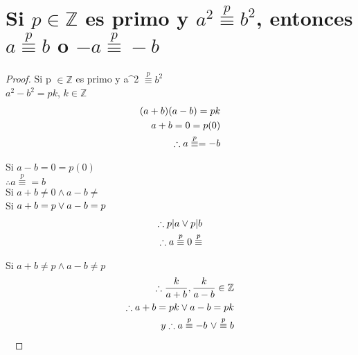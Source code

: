 \section{Si $p \in \mathbb{Z}$ es primo y $a^2 \stackrel{p}{\equiv} b^2$, entonces $a \stackrel{p}{\equiv} b$ o $-a \stackrel{p}{\equiv} -b$}
 \begin{proof}

    Si p $\in \mathbb{Z}$  es primo y a^2 $\stackrel{p}{ \equiv } b^2$ \\
   $a^2-b^2 = pk$,  $k \in \mathbb{Z}$
   \begin{align}
        \notag (a+b)(a-b)= pk\\
        \notag a+b = 0=p(0)\\
        \notag \therefore a \stackrel{p}{ \equiv } = -b\\
   \end{align}

   Si $a-b = 0=p(0)$\\
   $\therefore a \stackrel{p}{ \equiv } = b$\\
    Si $a+b \neq 0 \land a-b \neq $\\
    Si  $a+b= p  \lor a-b = p\\$
    \begin{align}
    \notag \therefore p | a \lor p | b \\
    \notag \therefore a\stackrel{p}{ \equiv } 0 \stackrel{p}{ \equiv } \\
    \end{align}

    Si $ a+b \neq p  \land a-b \neq p$ \\
    \begin{align}
\notag \therefore \frac{k}{a+b}, \frac{k}{a-b} \in \mathbb{Z}\\
    \therefore a+b = pk \lor a-b = pk \\
    \notag y \therefore a\stackrel{p}{ \equiv }-b \ \lor 
    \notag \stackrel{p}{ \equiv } b
    \end{align} \

 \end{proof}